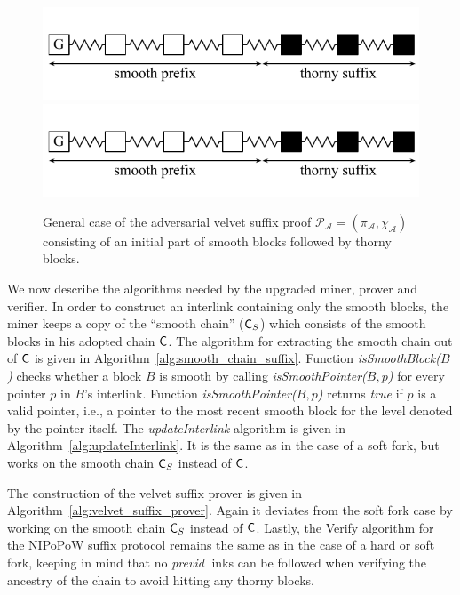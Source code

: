 \begin{figure}[h!]
	\begin{center}
		\iftwocolumn
			\includegraphics[width=0.9\columnwidth]{figures/adversarial_velvet_proof.pdf}
		\else
			\includegraphics[width=0.5\columnwidth]{figures/adversarial_velvet_proof.pdf}
		\fi
	\end{center}
	\caption{General case of the adversarial velvet suffix proof $\mathcal{P_A} = (\pi_\mathcal{A}, \chi_\mathcal{A})$ consisting of an initial part of smooth blocks followed by thorny blocks.}
	\label{fig:adversarial_velvet_proof}
\end{figure}
We now describe the algorithms needed by the upgraded miner, prover and verifier. In order to construct an interlink containing only the smooth blocks, the miner keeps a copy of the ``smooth chain'' ($\mathsf{C}_S$) which consists of the smooth blocks in his adopted chain $\mathsf{C}$. The algorithm for extracting the smooth chain out of $\mathsf{C}$ is given in Algorithm~\ref{alg:smooth_chain_suffix}. Function \emph{isSmoothBlock($B$)} checks whether a block $B$ is smooth by calling \textit{isSmoothPointer($B,p$)} for every pointer $p$ in $B$'s interlink. Function \emph{isSmoothPointer($B,p$)} returns \emph{true} if $p$ is a valid pointer, i.e., a pointer to the most recent smooth block for the level denoted by the pointer itself. The \emph{updateInterlink} algorithm is given in Algorithm~\ref{alg:updateInterlink}. It is the same as in the case of a soft fork, but works on the smooth chain $\mathsf{C}_S$ instead of $\mathsf{C}$.

The construction of the velvet suffix prover is given in Algorithm~\ref{alg:velvet_suffix_prover}. Again it deviates from the soft fork case by working on the smooth chain $\mathsf{C}_S$ instead of $\mathsf{C}$.
Lastly, the Verify algorithm for the NIPoPoW suffix protocol remains the same as in the case of a hard or soft fork, keeping in mind that no \emph{previd} links can be followed when verifying the ancestry of the chain to avoid hitting any thorny blocks.

